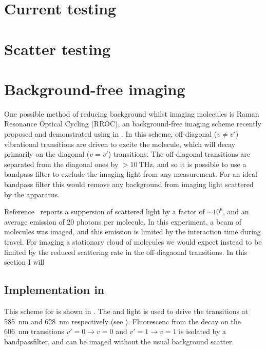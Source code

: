 \section{Current testing}




\section{Scatter testing}


\section{Background-free imaging}


One possible method of reducing background whilst imaging molecules is Raman
Resonance Optical Cycling (RROC), an background-free imaging scheme recently
proposed and demonstrated using \SrF{} in . In this scheme,
off-diagonal ($v\neq v'$) vibrational transitions are driven to excite the
molecule, which will decay primarily on the diagonal ($v=v'$) transitions. The
off-diagonal transitions are separated from the diagonal ones by
$>\SI{10}{\tera\hertz}$, and so it is possible to use a bandpass filter to
exclude the imaging light from any measurement. For an ideal bandpass filter
this would remove any background from imaging light scattered by the apparatus.

Reference~\cite{Shaw2021} reports a suppersion of scattered light by a factor
of $\sim10^6$, and an average emission of 20 photons per molecule. In this
experiment, a beam of molecules was imaged, and this emission is limited by the
interaction time during travel. For imaging a stationary cloud of molecules we
would expect instead to be limited by the reduced scattering rate in the
off-diagaonal transitions. In this section I will 

\subsection{Implementation in \CaF{}}


This scheme for \CaF{} is shown in . The
 and  light is used to drive the transitions at
\SI{585}{\nano\meter} and \SI{628}{\nano\meter} respectively (see
). Fluorescenc from the decay on the
\SI{606}{\nano\meter} transitions $v'=0\rightarrow v=0$ and $v'=1\rightarrow
v=1$ is isolated by a bandpassfilter, and can be imaged without the usual
background scatter.

